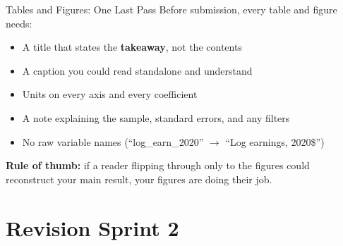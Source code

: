 \begin{frame}{Tables and Figures: One Last Pass}
  Before submission, every table and figure needs:

  \vspace{6pt}

  \begin{itemize}\setlength\itemsep{2pt}
    \item A title that states the \textbf{takeaway}, not the contents
    \item A caption you could read standalone and understand
    \item Units on every axis and every coefficient
    \item A note explaining the sample, standard errors, and any filters
    \item No raw variable names (``log\_earn\_2020'' $\to$ ``Log earnings, 2020\$'')
  \end{itemize}

  \vspace{8pt}

  \textbf{Rule of thumb:} if a reader flipping through only to the figures could reconstruct your main result, your figures are doing their job.
\end{frame}

\section{Revision Sprint 2}

